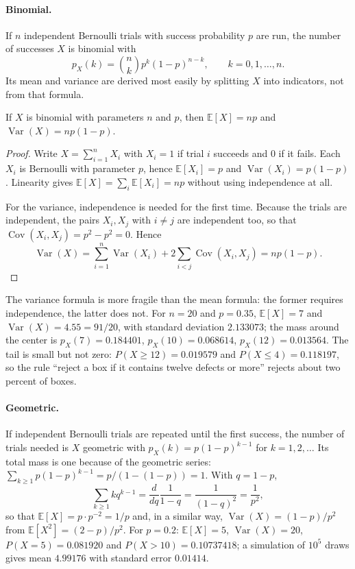 \paragraph{Binomial.} If $n$ independent Bernoulli trials with success probability $p$
are run, the number of successes $X$ is binomial with
\[
p_X(k)=\binom{n}{k}p^k(1-p)^{n-k},\qquad k=0,1,\dots,n .
\]
Its mean and variance are derived most easily by splitting $X$ into indicators,
not from that formula.

\begin{teorema}
If $X$ is binomial with parameters $n$ and $p$, then
$\mathbb{E}[X]=np$ and $\operatorname{Var}(X)=np(1-p)$.
\end{teorema}

\begin{proof}
Write $X=\sum_{i=1}^{n}X_i$ with $X_i=1$ if trial $i$ succeeds and $0$ if it
fails. Each $X_i$ is Bernoulli with parameter $p$, hence $\mathbb{E}[X_i]=p$ and
$\operatorname{Var}(X_i)=p(1-p)$. Linearity gives
$\mathbb{E}[X]=\sum_i\mathbb{E}[X_i]=np$ without using independence at all.

For the variance, independence is needed for the first time. Because the trials are independent, the pairs
$X_i,X_j$ with $i\ne j$ are independent too, so that
$\operatorname{Cov}(X_i,X_j)=p^2-p^2=0$. Hence
\[
\operatorname{Var}(X)=\sum_{i=1}^{n}\operatorname{Var}(X_i)
+2\sum_{i<j}\operatorname{Cov}(X_i,X_j)=np(1-p).
\]
\end{proof}

The variance formula is more fragile than the mean formula: the former requires independence,
the latter does not. For $n=20$ and $p=0.35$, $\mathbb{E}[X]=7$ and
$\operatorname{Var}(X)=4.55=91/20$, with standard deviation $2.133073$; the mass
around the center is $p_X(7)=0.184401$, $p_X(10)=0.068614$, $p_X(12)=0.013564$.
The tail is small but not zero: $P(X\ge12)=0.019579$ and $P(X\le4)=0.118197$, so the
rule ``reject a box if it contains twelve defects or more'' rejects about two percent of
boxes.

\paragraph{Geometric.} If independent Bernoulli trials are repeated until the first success,
the number of trials needed is $X$ geometric with
$p_X(k)=p(1-p)^{k-1}$ for $k=1,2,\dots$ Its total mass is one because of the geometric series:
$\sum_{k\ge1}p(1-p)^{k-1}=p/(1-(1-p))=1$. With $q=1-p$,
\[
\sum_{k\ge1}kq^{k-1}=\frac{d}{dq}\frac{1}{1-q}=\frac{1}{(1-q)^2}=\frac{1}{p^2},
\]
so that $\mathbb{E}[X]=p\cdot p^{-2}=1/p$ and, in a similar way,
$\operatorname{Var}(X)=(1-p)/p^2$ from $\mathbb{E}[X^2]=(2-p)/p^2$. For $p=0.2$:
$\mathbb{E}[X]=5$, $\operatorname{Var}(X)=20$, $P(X=5)=0.081920$ and
$P(X>10)=0.10737418$; a simulation of $10^5$ draws gives mean $4.99176$ with
standard error $0.01414$.


